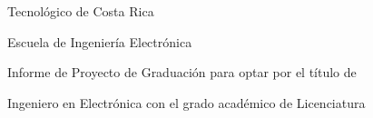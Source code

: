 
\thispagestyle{empty} 

\begin{center}

Tecnol\'{o}gico de Costa Rica

\par\vspace{1ex}

Escuela de Ingenier\'{i}a Electr\'{o}nica

\par\vspace{20mm}


\par\vspace*{\fill}

{\large\bf{\scriptTitle}}

\par\vspace*{\fill}

Informe de Proyecto de Graduaci\'{o}n para optar por el t\'{i}tulo de

Ingeniero en Electr\'{o}nica con el grado acad\'{e}mico de Licenciatura

\par\vspace{20mm}

\scriptAuthor

\vspace*{\fill}

\end{center}


